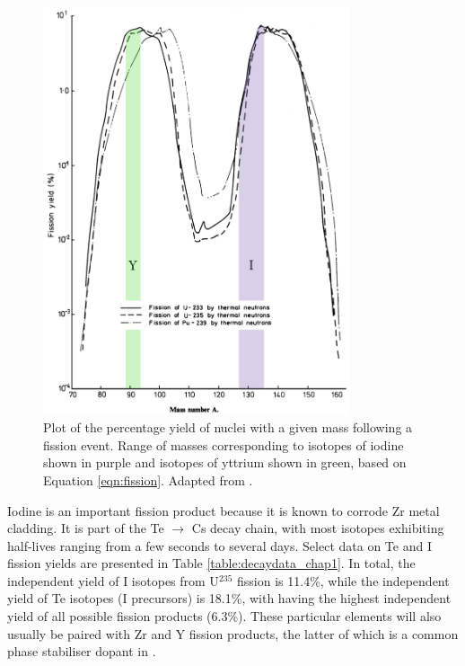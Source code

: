 \begin{figure}[ht]
\centering
\includegraphics[height=12cm]{images/fissionyield.jpg}
\caption[Plot of the percentage yield of nuclei with a given mass following a fission event. Range of masses corresponding to isotopes of iodine shown in purple and isotopes of yttrium shown in green, based on Equation \ref{eqn:fission}.]{Plot of the percentage yield of nuclei with a given mass following a fission event. Range of masses corresponding to isotopes of iodine shown in purple and isotopes of yttrium shown in green, based on Equation \ref{eqn:fission}. Adapted from \cite{England1992}.}
\label{figure:fissionyield}
\end{figure}

Iodine is an important fission product because it is known to corrode Zr metal cladding. It is part of the Te $\rightarrow$ Cs decay chain, with most isotopes exhibiting half-lives ranging from a few seconds to several days. Select data on Te and I fission yields are presented in Table \ref{table:decaydata_chap1}. In total, the independent yield of I isotopes from U$^{235}$ fission is 11.4\%, while the independent yield of Te isotopes (I precursors) is 18.1\%, with  having the highest independent yield of all possible fission products (6.3\%). These particular elements will also usually be paired with Zr and Y fission products, the latter of which is a common phase stabiliser dopant in \zirconia .

